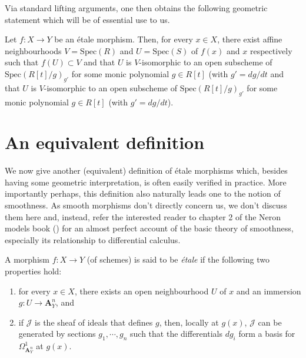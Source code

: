 \noindent
Via standard lifting arguments, one then obtains the following geometric
statement which will be of essential use to us.

\begin{theorem}
\label{theorem-geometric-structure}
Let $f : X \to Y$ be an \'etale morphism. Then, for every $x \in X$, there
exist affine neighbourhoods $V = \text{Spec}(R)$ and $U = \text{Spec}(S)$ of
$f(x)$
and $x$ respectively such that $f(U) \subset V$ and that $U$ is $V$-isomorphic
to an open subscheme of $\text{Spec}(R[t]/g)_{g'}$ for some monic polynomial
$g \in R[t]$  (with $g' = dg/dt$ and that $U$ is $V$-isomorphic to an open
subscheme of $\text{Spec}(R[t]/g)_{g'}$ for some monic polynomial $g \in R[t]$
(with $g' = dg/dt$).
\end{theorem}

\section{An equivalent definition}
\label{section-definition-equivalent}

\noindent
We now give another (equivalent) definition of \'etale morphisms which,
besides having some geometric interpretation, is often easily verified in
practice. More importantly perhaps, this definition also naturally leads
one to the notion of smoothness. As smooth morphisms don't directly concern
us, we don't discuss them here and, instead, refer the interested reader to
chapter 2 of the Neron models book (\cite{Ner}) for an almost perfect
account of the basic theory of smoothness, especially its relationship to
differential calculus.

\begin{definition}
\label{definition-etale-differential}
A morphism $f : X \to Y$ (of schemes) is said to be
{\it \'etale} if the following
two properties hold:
\begin{enumerate}
\item for every $x \in X$, there exists an open neighbourhood $U$ of $x$ and an
immersion $g : U \to \mathbf{A}^n_Y$, and
\item if $\mathcal{J}$ is the sheaf of ideals that defines $g$, then, locally at
$g(x)$, $\mathcal{J}$ can be generated by sections $g_1, \cdots, g_n$ such that
the
differentials $dg_i$ form a basis for $\Omega^1_{\mathbf{A}^n_Y}$ at $g(x)$.
\end{enumerate}
\end{definition}

